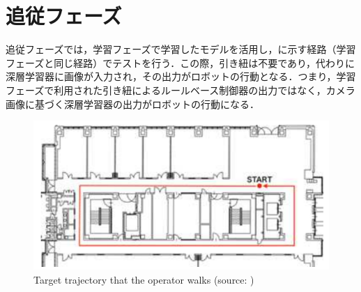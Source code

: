 
\section{追従フェーズ}

  追従フェーズでは，学習フェーズで学習したモデルを活用し，に示す経路（学習フェーズと同じ経路）でテストを行う．この際，引き紐は不要であり，代わりに深層学習器に画像が入力され，その出力がロボットの行動となる．つまり，学習フェーズで利用された引き紐によるルールベース制御器の出力ではなく，カメラ画像に基づく深層学習器の出力がロボットの行動になる．

  \vspace{2cm}

  \begin{figure}[h]
    \centering
    \includegraphics[keepaspectratio, scale=1.2] {images/pdf/okada_route}
    \caption[Target trajectory that the operator walks]{Target trajectory that the operator walks (source: \cite{okada})}
    \label{Fig:okada_route}
  \end{figure}

\newpage